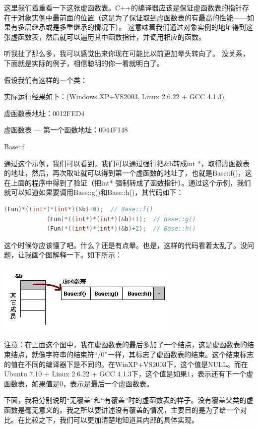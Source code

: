 \documentclass{article}
\begin{document}
\begin{CJK}{UTF8}{gbsn}
这里我们着重看一下这张虚函数表。C++的编译器应该是保证虚函数表的指针存在于对象实例中最前面的位置（这是为了保证取到虚函数表的有最高的性能——如果有多层继承或是多重继承的情况下）。 这意味着我们通过对象实例的地址得到这张虚函数表，然后就可以遍历其中函数指针，并调用相应的函数。
 
听我扯了那么多，我可以感觉出来你现在可能比以前更加晕头转向了。 没关系，下面就是实际的例子，相信聪明的你一看就明白了。
 
假设我们有这样的一个类：

实际运行经果如下：(Windows XP+VS2003,  Linux 2.6.22 + GCC 4.1.3)
 
虚函数表地址：0012FED4

虚函数表 — 第一个函数地址：0044F148

Base::f
 
通过这个示例，我们可以看到，我们可以通过强行把\&b转成int *，取得虚函数表的地址，然后，再次取址就可以得到第一个虚函数的地址了，也就是Base::f()，这在上面的程序中得到了验证（把int* 强制转成了函数指针）。通过这个示例，我们就可以知道如果要调用Base::g()和Base::h()，其代码如下：
\begin{lstlisting}[language=c++]
            (Fun)*((int*)*(int*)(&b)+0);  // Base::f()
            (Fun)*((int*)*(int*)(&b)+1);  // Base::g()
            (Fun)*((int*)*(int*)(&b)+2);  // Base::h()
\end{lstlisting} 
这个时候你应该懂了吧。什么？还是有点晕。也是，这样的代码看着太乱了。没问题，让我画个图解释一下。如下所示：

\includegraphics{m0.jpg}

注意：在上面这个图中，我在虚函数表的最后多加了一个结点，这是虚函数表的结束结点，就像字符串的结束符“/0”一样，其标志了虚函数表的结束。这个结束标志的值在不同的编译器下是不同的。在WinXP+VS2003下，这个值是NULL。而在Ubuntu 7.10 + Linux 2.6.22 + GCC 4.1.3下，这个值是如果1，表示还有下一个虚函数表，如果值是0，表示是最后一个虚函数表。
  
下面，我将分别说明“无覆盖”和“有覆盖”时的虚函数表的样子。没有覆盖父类的虚函数是毫无意义的。我之所以要讲述没有覆盖的情况，主要目的是为了给一个对比。在比较之下，我们可以更加清楚地知道其内部的具体实现。


\end{CJK}
\end{document}
